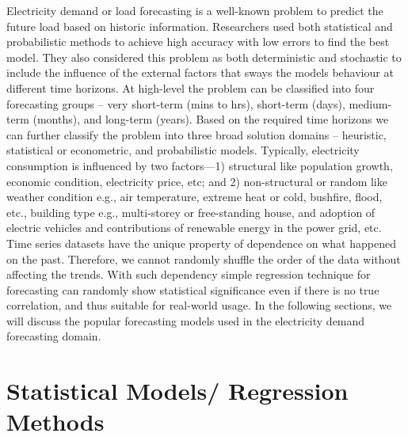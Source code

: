 \documentclass[mstat,12pt]{unswthesis}
\begin{document}
Electricity demand or load forecasting is a well-known problem to
predict the future load based on historic information. Researchers used
both statistical and probabilistic methods to achieve high accuracy with
low errors to find the best model. They also considered this problem as
both deterministic and stochastic to include the influence of the
external factors that sways the models behaviour at different time
horizons. At high-level the problem can be classified into four
forecasting groups -- very short-term (mins to hrs), short-term (days),
medium-term (months), and long-term (years). Based on the required time
horizons we can further classify the problem into three broad solution
domains -- heuristic, statistical or econometric, and probabilistic
models. Typically, electricity consumption is influenced by two
factors---1) structural like population growth, economic condition,
electricity price, etc; and 2) non-structural or random like weather
condition e.g., air temperature, extreme heat or cold, bushfire, flood,
etc., building type e.g., multi-storey or free-standing house, and
adoption of electric vehicles and contributions of renewable energy in
the power grid, etc. Time series datasets have the unique property of
dependence on what happened on the past. Therefore, we cannot randomly
shuffle the order of the data without affecting the trends. With such
dependency simple regression technique for forecasting can randomly show
statistical significance even if there is no true correlation, and thus
suitable for real-world usage. In the following sections, we will
discuss the popular forecasting models used in the electricity demand
forecasting domain.

\section{Statistical Models/ Regression
Methods}\label{statistical-models-regression-methods}
\end{document}

